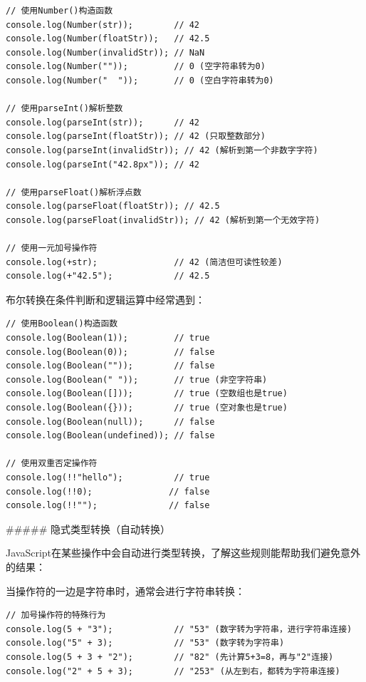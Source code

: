 {\begin{lstlisting}[style=javascript]
// 使用Number()构造函数
console.log(Number(str));        // 42
console.log(Number(floatStr));   // 42.5
console.log(Number(invalidStr)); // NaN
console.log(Number(""));         // 0 (空字符串转为0)
console.log(Number("  "));       // 0 (空白字符串转为0)

// 使用parseInt()解析整数
console.log(parseInt(str));      // 42
console.log(parseInt(floatStr)); // 42 (只取整数部分)
console.log(parseInt(invalidStr)); // 42 (解析到第一个非数字字符)
console.log(parseInt("42.8px")); // 42

// 使用parseFloat()解析浮点数  
console.log(parseFloat(floatStr)); // 42.5
console.log(parseFloat(invalidStr)); // 42 (解析到第一个无效字符)

// 使用一元加号操作符
console.log(+str);               // 42 (简洁但可读性较差)
console.log(+"42.5");            // 42.5
\end{lstlisting}


布尔转换在条件判断和逻辑运算中经常遇到：

\begin{lstlisting}[style=javascript]
// 使用Boolean()构造函数
console.log(Boolean(1));         // true
console.log(Boolean(0));         // false
console.log(Boolean(""));        // false
console.log(Boolean(" "));       // true (非空字符串)
console.log(Boolean([]));        // true (空数组也是true)
console.log(Boolean({}));        // true (空对象也是true)
console.log(Boolean(null));      // false
console.log(Boolean(undefined)); // false

// 使用双重否定操作符
console.log(!!"hello");          // true
console.log(!!0);               // false
console.log(!!"");              // false
\end{lstlisting}

##### 隐式类型转换（自动转换）

JavaScript在某些操作中会自动进行类型转换，了解这些规则能帮助我们避免意外的结果：


当操作符的一边是字符串时，通常会进行字符串转换：

\begin{lstlisting}[style=javascript]
// 加号操作符的特殊行为
console.log(5 + "3");            // "53" (数字转为字符串，进行字符串连接)
console.log("5" + 3);            // "53" (数字转为字符串)
console.log(5 + 3 + "2");        // "82" (先计算5+3=8，再与"2"连接)
console.log("2" + 5 + 3);        // "253" (从左到右，都转为字符串连接)


\end{lstlisting}}
